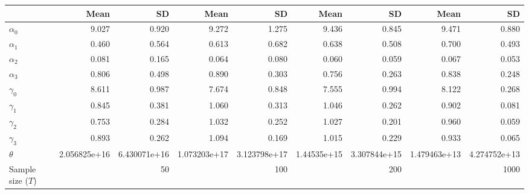 
\begin{tabular}[t]{lrrrrrrrr}
\toprule
  & Mean & SD & Mean  & SD  & Mean   & SD   & Mean    & SD   \\
\midrule
$\alpha_{0}$ & 9.027 & 0.920 & 9.272 & 1.275 & 9.436 & 0.845 & 9.471 & 0.880\\
$\alpha_{1}$ & 0.460 & 0.564 & 0.613 & 0.682 & 0.638 & 0.508 & 0.700 & 0.493\\
$\alpha_{2}$ & 0.081 & 0.165 & 0.064 & 0.080 & 0.060 & 0.059 & 0.067 & 0.053\\
$\alpha_{3}$ & 0.806 & 0.498 & 0.890 & 0.303 & 0.756 & 0.263 & 0.838 & 0.248\\
$\gamma_{0}$ & 8.611 & 0.987 & 7.674 & 0.848 & 7.555 & 0.994 & 8.122 & 0.268\\
$\gamma_{1}$ & 0.845 & 0.381 & 1.060 & 0.313 & 1.046 & 0.262 & 0.902 & 0.081\\
$\gamma_{2}$ & 0.753 & 0.284 & 1.032 & 0.252 & 1.027 & 0.201 & 0.960 & 0.059\\
$\gamma_{3}$ & 0.893 & 0.262 & 1.094 & 0.169 & 1.015 & 0.229 & 0.933 & 0.065\\
$\theta$ & 2.056825e+16 & 6.430071e+16 & 1.073203e+17 & 3.123798e+17 & 1.44535e+15 & 3.307844e+15 & 1.479463e+13 & 4.274752e+13\\
Sample size ($T$) &  & 50 &  & 100 &  & 200 &  & 1000\\
\bottomrule
\end{tabular}
